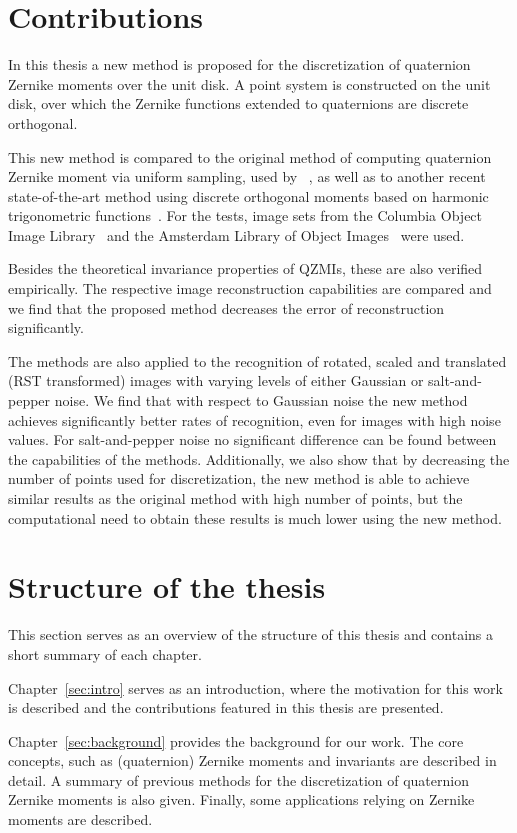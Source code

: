 \section{Contributions}
In this thesis a new method is proposed for the discretization of quaternion Zernike moments over the unit disk. A point system is constructed on the unit disk, over which the Zernike functions extended to quaternions are discrete orthogonal. 

This new method is compared to the original method of computing quaternion Zernike moment via uniform sampling, used by \citeauthor{qzmi}~\cite{qzmi}, as well as to another recent state-of-the-art method using discrete orthogonal moments based on harmonic trigonometric functions~\cite{LiuAcc}. For the tests, image sets from the Columbia Object Image Library~\cite{coil} and the Amsterdam Library of Object Images~\cite{aloi} were used. 

Besides the theoretical invariance properties of QZMIs, these are also verified empirically. The respective image reconstruction capabilities are compared and we find that the proposed method decreases the error of reconstruction significantly.

The methods are also applied to the recognition of rotated, scaled and translated (RST transformed) images with varying levels of either Gaussian or salt-and-pepper noise. We find that with respect to Gaussian noise the new method achieves significantly better rates of recognition, even for images with high noise values. For salt-and-pepper noise no significant difference can be found between the capabilities of the methods.
Additionally, we also show that by decreasing the number of points used for discretization, the new method is able to achieve similar results as the original method with high number of points, but the computational need to obtain these results is much lower using the new method.


\section{Structure of the thesis}
This section serves as an overview of the structure of this thesis and contains a short summary of each chapter.

Chapter~\ref{sec:intro} serves as an introduction, where the motivation for this work is described and the contributions featured in this thesis are presented.

Chapter~\ref{sec:background} provides the background for our work. The core concepts, such as (quaternion) Zernike moments and invariants are described in detail. A summary of previous methods for the discretization of quaternion Zernike moments is also given. Finally, some applications relying on Zernike moments are described.

